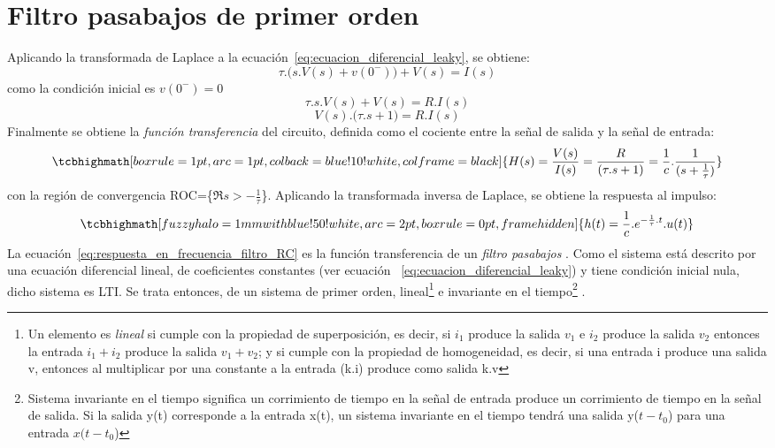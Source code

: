 \section{Filtro pasabajos de primer orden}\label{sec:filtro_pasabajos_primer_orden}
Aplicando la transformada de Laplace \cite{10.5555/248702} a la ecuación~\ref{eq:ecuacion_diferencial_leaky}, se obtiene:
\[
     \tau.\big(s .V(s) + v(0^-)\big) + V(s)= I(s)
\]
como la condición inicial es $v(0^-)=0$
\[
     \tau.s .V(s) + V(s)= R.I(s)
\]
\[
    V(s).\big( \tau.s + 1\big) = R.I(s)
\]
Finalmente se obtiene la \textit{función transferencia} del circuito, definida como el cociente entre la señal de salida y la señal de entrada:
\begin{equation}\label{eq:respuesta_en_frecuencia_filtro_RC}
     \tcbhighmath[boxrule=1pt,arc=1pt,colback=blue!10!white,colframe=black]{H(s)=\frac{V(s)}{I(s)} = \frac{R}{(\tau.s+ 1)}=\frac{1}{c}.\frac{1}{(s+\frac{1}{\tau})}}
\end{equation}
con la región de convergencia ROC=\big\{$\Re{s}>-\frac{1}{\tau}$\}\big.
Aplicando la transformada inversa de Laplace, se obtiene la respuesta al impulso:
\[
\tcbhighmath[fuzzy halo=1mm with blue!50!white,arc=2pt,
  boxrule=0pt,frame hidden]{h(t)= \frac{1}{c}.e^{-\frac{1}{\tau}.t}.u(t)}
\]
La ecuación~\ref{eq:respuesta_en_frecuencia_filtro_RC} es la función transferencia de un \textit{filtro pasabajos} \cite{dorf2013introduction}.
Como el sistema está descrito por una ecuación diferencial lineal, de coeficientes constantes (ver ecuación ~\ref{eq:ecuacion_diferencial_leaky}) y tiene condición inicial nula, dicho sistema es LTI. Se trata entonces, de un sistema de primer orden, lineal\footnote{Un elemento es \textit{lineal} si cumple con la propiedad de superposición, es decir, si $i_1$ produce la salida $v_1$ e $i_2$ produce la salida $v_2$ entonces la entrada $i_1+i_2$ produce la salida $v_1+v_2$; y si cumple con la propiedad de homogeneidad, es decir, si una entrada i produce una salida v, entonces al multiplicar por una constante a la entrada (k.i) produce como salida k.v} e invariante en el tiempo\footnote{Sistema invariante en el tiempo significa un corrimiento de tiempo en la señal de entrada produce un corrimiento de tiempo en la señal de salida. Si la salida y(t) corresponde a la entrada x(t), un sistema invariante en el tiempo tendrá una salida y($t-t_0$) para una entrada $x(t-t_0$)} \cite{10.5555/248702}.
\newpage
